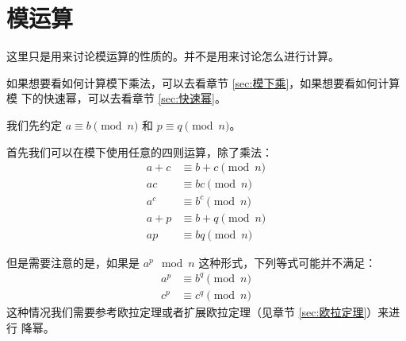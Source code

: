 \section{模运算} \label{sec:模运算}
这里只是用来讨论模运算的性质的。并不是用来讨论怎么进行计算。

如果想要看如何计算模下乘法，可以去看章节 \ref{sec:模下乘}，如果想要看如何计算模
下的快速幂，可以去看章节 \ref{sec:快速幂}。

我们先约定 $a \equiv b \pmod n$ 和 $p \equiv q \pmod n$。

首先我们可以在模下使用任意的四则运算，除了乘法：\begin{align*}
    a + c & \equiv b + c \pmod n \\
    ac & \equiv bc \pmod n \\
    a^c & \equiv b^c \pmod n \\
    a + p & \equiv b + q \pmod n \\
    ap & \equiv bq \pmod n
\end{align*}

但是需要注意的是，如果是 $a^p \mod n$ 这种形式，下列等式可能并不满足：\begin{align*}
    a^p & \equiv b^q \pmod n \\
    c^p & \equiv c^q \pmod n
\end{align*}
这种情况我们需要参考欧拉定理或者扩展欧拉定理（见章节 \ref{sec:欧拉定理}）来进行
降幂。

